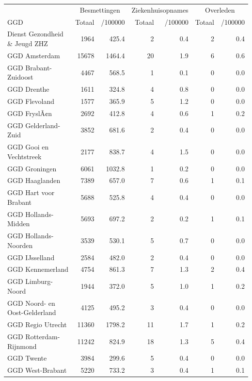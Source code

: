 \documentclass[
  english,
  man,floatsintext]{apa6}
\begin{document}
\begin{table}
\centering\begingroup\fontsize{10}{12}\selectfont

\begin{threeparttable}
\begin{tabular}{lrrrrrr}
\toprule
\multicolumn{1}{c}{ } & \multicolumn{2}{c}{Besmettingen} & \multicolumn{2}{c}{Ziekenhuisopnames} & \multicolumn{2}{c}{Overleden} \\
\cmidrule(l{3pt}r{3pt}){2-3} \cmidrule(l{3pt}r{3pt}){4-5} \cmidrule(l{3pt}r{3pt}){6-7}
GGD & Totaal & /100000 & Totaal & /100000 & Totaal & /100000\\
\midrule
Dienst Gezondheid \& Jeugd ZHZ & 1964 & 425.4 & 2 & 0.4 & 2 & 0.4\\
GGD Amsterdam & 15678 & 1464.4 & 20 & 1.9 & 6 & 0.6\\
GGD Brabant-Zuidoost & 4467 & 568.5 & 1 & 0.1 & 0 & 0.0\\
GGD Drenthe & 1611 & 324.8 & 4 & 0.8 & 0 & 0.0\\
GGD Flevoland & 1577 & 365.9 & 5 & 1.2 & 0 & 0.0\\
GGD FryslÃ¢n & 2692 & 412.8 & 4 & 0.6 & 1 & 0.2\\
GGD Gelderland-Zuid & 3852 & 681.6 & 2 & 0.4 & 0 & 0.0\\
GGD Gooi en Vechtstreek & 2177 & 838.7 & 4 & 1.5 & 0 & 0.0\\
GGD Groningen & 6061 & 1032.8 & 1 & 0.2 & 0 & 0.0\\
GGD Haaglanden & 7389 & 657.0 & 7 & 0.6 & 1 & 0.1\\
GGD Hart voor Brabant & 5688 & 525.8 & 4 & 0.4 & 0 & 0.0\\
GGD Hollands-Midden & 5693 & 697.2 & 2 & 0.2 & 1 & 0.1\\
GGD Hollands-Noorden & 3539 & 530.1 & 5 & 0.7 & 0 & 0.0\\
GGD IJsselland & 2584 & 482.0 & 2 & 0.4 & 0 & 0.0\\
GGD Kennemerland & 4754 & 861.3 & 7 & 1.3 & 2 & 0.4\\
GGD Limburg-Noord & 1944 & 372.0 & 5 & 1.0 & 1 & 0.2\\
GGD Noord- en Oost-Gelderland & 4125 & 495.2 & 3 & 0.4 & 0 & 0.0\\
GGD Regio Utrecht & 11360 & 1798.2 & 11 & 1.7 & 1 & 0.2\\
GGD Rotterdam-Rijnmond & 11242 & 824.9 & 18 & 1.3 & 5 & 0.4\\
GGD Twente & 3984 & 299.6 & 5 & 0.4 & 0 & 0.0\\
GGD West-Brabant & 5220 & 733.2 & 3 & 0.4 & 1 & 0.1\\

\end{tabular}
\end{threeparttable}
\end{table}
\end{document}
